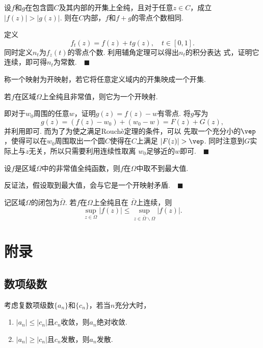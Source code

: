   \begin{thm}[Rouchè]
    \label{thm: Rouche}
    设$f$和$g$在包含圆$C$及其内部的开集上全纯，且对于任意$z\in C$，成立
    $|f(z)|>|g(z)|$. 则在$C$内部，$f$和$f+g$的零点个数相同.
  \end{thm}
  \proof
    定义
    \[
      f_t(z) = f(z) + tg(z),\quad t\in[0, 1].
    \]
    同时定义$n_t$为$f_z(t)$的零点个数. 利用辅角定理可以得出$n_t$的积分表达
    式，证明它连续，即可得$n_t$为常数.$\quad\blacksquare$

  \begin{defi}[开映射]
    称一个映射为开映射，若它将任意定义域内的开集映成一个开集.
  \end{defi}

  \begin{thm}[开映射]
    若$f$在区域$\Omega$上全纯且非常值，则它为一个开映射.
  \end{thm}
  \proof
    即对于$w_0$周围的任意$w$，证明$g(z)=f(z)-w$有零点. 将$g$写为
    \[
      g(z) = (f(z)-w_0) + (w_0-w) = F(z) + G(z),
    \]
    并利用即可. 而为了为使之满足Rouchè定理的条件，可以
    先取一个充分小的$\vep$，使得可以在$w_0$周围取出一个圆$C$使得在$C$上满足
    $|F(z)|>\vep$. 同时注意到$G$实际上与$z$无关，所以只需要利用连续性取离
    $w_0$足够近的$w$即可.$\quad\blacksquare$


  \begin{thm}[最大模原理]
    设$f$是区域$\Omega$中的非常值全纯函数，则$f$在$\Omega$中取不到最大值.
  \end{thm}
  \proof
    反证法，假设取到最大值，会与它是一个开映射矛盾.$\quad\blacksquare$

  \begin{cor}
    记区域$\Omega$的闭包为$\bar{\Omega}$. 若$f$在$\Omega$上全纯且在
    $\bar{\Omega}$上连续，则
    \[
      \sup_{z\in\Omega}|f(z)| \le \sup_{z\in\bar{\Omega}\backslash\Omega}|f(z)|.
    \]
  \end{cor}

\newpage
\section{附录}

\subsection{数项级数}

  \begin{thm}
    考虑复数项级数$\{a_n\}$和$\{c_n\}$，若当$n$充分大时，
    \begin{enumerate}
      \item $|a_n| \le |c_n|$且$c_n$收敛，则$a_n$绝对收敛.
      \item $|a_n| \ge |c_n|$且$c_n$发散，则$a_n$发散.
    \end{enumerate}
  \end{thm}

